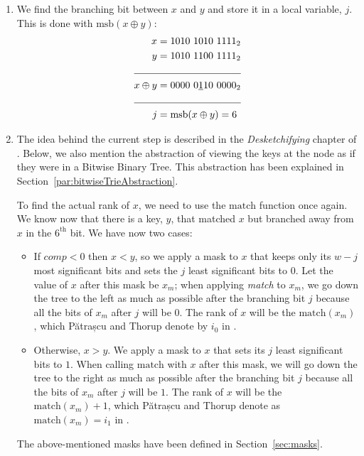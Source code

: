 \begin{enumerate}
    \item
    We find the branching bit between $x$ and $y$ and store it in a local variable, $j$. This is done with $\text{msb}(x \oplus y)$:
    \begin{align*}
        x &= 1010\ 1010\ 1111_2\\
        y &= 1010\ 1100\ 1111_2\\
        \cline{1-2}
        x \oplus y &= 0000\ 0\underline{1}10\ 0000_2\\
        \cline{1-2}
        j &= \text{msb}(x \oplus y) = 6
    \end{align*}
    
    \item
    The idea behind the current step is described in the \textit{Desketchifying} chapter of \cite{erikdemainelec12}. Below, we also mention the abstraction of viewing the keys at the node as if they were in a Bitwise Binary Tree. This abstraction has been explained in Section~\ref{par:bitwiseTrieAbstraction}.
    
    To find the actual rank of $x$, we need to use the $\text{match}$ function once again. We know now that there is a key, $y$, that matched $x$ but branched away from $x$ in the $6^{\text{th}}$ bit.
    We have now two cases:
    \begin{itemize}
        \item
        If $comp < 0$ then $x < y$, so we apply a mask to $x$ that keeps only its $w-j$ most significant bits and sets the $j$ least significant bits to $0$. Let the value of $x$ after this mask be $x_m$; when applying \textit{match} to $x_m$, we go down the tree to the left as much as possible after the branching bit $j$ because all the bits of $x_m$ after $j$ will be $0$. The rank of $x$ will be the $\text{match}(x_m)$, which Pătrașcu and Thorup denote by $i_0$ in \cite{patrascu2014dynamic}.
        
        \item
        Otherwise, $x > y$. We apply a mask to $x$ that sets its $j$ least significant bits to $1$. When calling $\text{match}$ with $x$ after this mask, we will go down the tree to the right as much as possible after the branching bit $j$ because all the bits of $x_m$ after $j$ will be $1$. The rank of $x$ will be the $\text{match}(x_m) + 1$, which Pătrașcu and Thorup denote as $\text{match}(x_m) = i_1$ in \cite{patrascu2014dynamic}.
    \end{itemize}
    The above-mentioned masks have been defined in Section~\ref{sec:masks}.
    

\end{enumerate}
